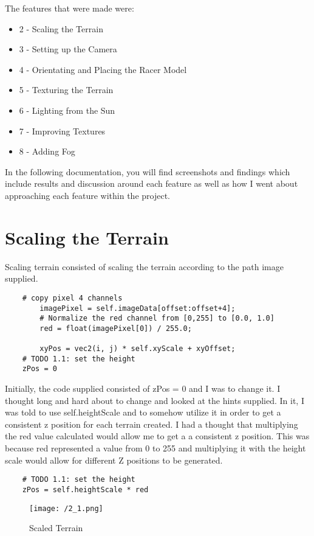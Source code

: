 \documentclass[11pt, oneside, a4paper]{article}
\begin{document}
The features that were made were:
\begin{itemize}
	\item{2 - Scaling the Terrain}
	\item{3 - Setting up the Camera}
	\item{4 - Orientating and Placing the Racer Model}
	\item{5 - Texturing the Terrain}
	\item{6 - Lighting from the Sun}
	\item{7 - Improving Textures}
    \item{8 - Adding Fog}

\end{itemize}


In the following documentation, you will find screenshots and findings which include results and discussion around each feature as well as how I went about approaching each feature within the project. 

\section{Scaling the Terrain}
Scaling terrain consisted of scaling the terrain according to the path image supplied.
\begin{lstlisting}    
	# copy pixel 4 channels
        imagePixel = self.imageData[offset:offset+4];
        # Normalize the red channel from [0,255] to [0.0, 1.0]
        red = float(imagePixel[0]) / 255.0;

        xyPos = vec2(i, j) * self.xyScale + xyOffset;
	# TODO 1.1: set the height
	zPos = 0
\end{lstlisting}

Initially, the code supplied consisted of zPos = 0 and I was to change it. I thought long and hard about to change and looked at the hints supplied. In it, I was told to use self.heightScale and to somehow utilize it in order to get a consistent z position for each terrain created. I had a thought that multiplying the red value calculated would allow me to get a a consistent z position. This was because red represented a value from 0 to 255 and multiplying it with the height scale would allow for different Z positions to be generated.

\newpage
\begin{lstlisting}    
	# TODO 1.1: set the height
	zPos = self.heightScale * red
\end{lstlisting}

\begin{figure}[!ht]
	\centerline{\texttt{[image: /2\_1.png]}}
	\caption{Scaled Terrain}
	\label{fig:figure1}
\end{figure}
\end{document}
